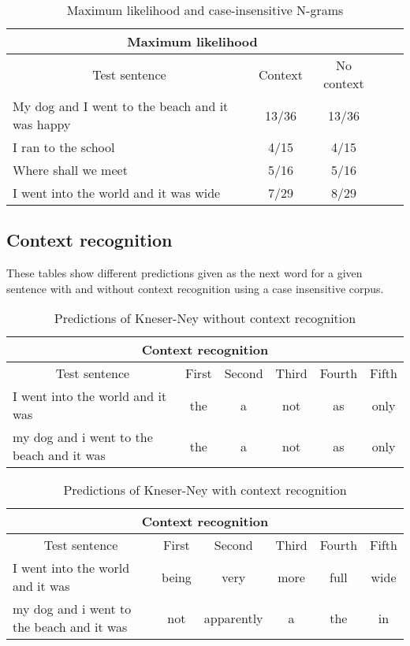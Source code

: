 \vspace{-1cm}
\begin{table}[H]
\centering
\caption{Maximum likelihood and case-insensitive N-grams}
{\scriptsize
\begin{tabular}{ |p{}|c|c|c|c| }
	\hline
	\multicolumn{3}{|c|}{Maximum likelihood} \\
	\hline
	\multicolumn{1}{|c|}{Test sentence} & Context & No context \\
	\hline
	My dog and I went to the beach and it was happy & 13/36 &13/36 \\
	\hline
	I ran to the school & 4/15 & 4/15 \\
	\hline
	Where shall we meet & 5/16 & 5/16 \\
	\hline
	I went into the world and it was wide & 7/29 & 8/29 \\
	\hline
\end{tabular}
}
\end{table}

\subsection{Context recognition}
These tables show different predictions given as the next word for a given sentence with and without context recognition using a case insensitive corpus.

\vspace{-0.5cm}
\begin{table}[H]
\centering
\caption{Predictions of Kneser-Ney without context recognition}
{\scriptsize
\begin{tabular}{ |p{}|c|c|c|c|c| }
	\hline
	\multicolumn{6}{|c|}{Context recognition} \\
	\hline
	\multicolumn{1}{|c|}{Test sentence} & First & Second & Third & Fourth & Fifth\\
	\hline
	I went into the world and it was & the & a & not & as & only \\
	\hline
	my dog and i went to the beach and it was & the & a & not & as & only \\
	\hline
\end{tabular}
}
\end{table}

\vspace{-1cm}
\begin{table}[H]
\centering
\caption{Predictions of Kneser-Ney with context recognition}
{\scriptsize
\begin{tabular}{ |p{}|c|c|c|c|c| }
	\hline
	\multicolumn{6}{|c|}{Context recognition} \\
	\hline
	\multicolumn{1}{|c|}{Test sentence} & First & Second & Third & Fourth & Fifth\\
	\hline
	I went into the world and it was & being & very & more & full & wide \\
	\hline
	my dog and i went to the beach and it was & not & apparently & a & the & in \\
	\hline
\end{tabular}
}
\end{table}

